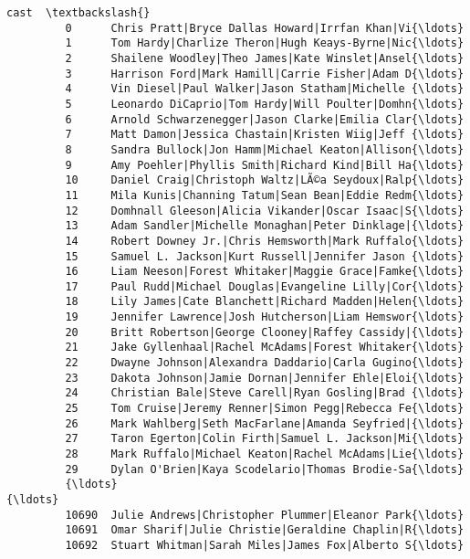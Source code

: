 \documentclass[11pt]{article}
\begin{document}
\begin{Verbatim}[commandchars=\\\{\}]
                                                             cast  \textbackslash{}
         0      Chris Pratt|Bryce Dallas Howard|Irrfan Khan|Vi{\ldots}   
         1      Tom Hardy|Charlize Theron|Hugh Keays-Byrne|Nic{\ldots}   
         2      Shailene Woodley|Theo James|Kate Winslet|Ansel{\ldots}   
         3      Harrison Ford|Mark Hamill|Carrie Fisher|Adam D{\ldots}   
         4      Vin Diesel|Paul Walker|Jason Statham|Michelle {\ldots}   
         5      Leonardo DiCaprio|Tom Hardy|Will Poulter|Domhn{\ldots}   
         6      Arnold Schwarzenegger|Jason Clarke|Emilia Clar{\ldots}   
         7      Matt Damon|Jessica Chastain|Kristen Wiig|Jeff {\ldots}   
         8      Sandra Bullock|Jon Hamm|Michael Keaton|Allison{\ldots}   
         9      Amy Poehler|Phyllis Smith|Richard Kind|Bill Ha{\ldots}   
         10     Daniel Craig|Christoph Waltz|LÃ©a Seydoux|Ralp{\ldots}   
         11     Mila Kunis|Channing Tatum|Sean Bean|Eddie Redm{\ldots}   
         12     Domhnall Gleeson|Alicia Vikander|Oscar Isaac|S{\ldots}   
         13     Adam Sandler|Michelle Monaghan|Peter Dinklage|{\ldots}   
         14     Robert Downey Jr.|Chris Hemsworth|Mark Ruffalo{\ldots}   
         15     Samuel L. Jackson|Kurt Russell|Jennifer Jason {\ldots}   
         16     Liam Neeson|Forest Whitaker|Maggie Grace|Famke{\ldots}   
         17     Paul Rudd|Michael Douglas|Evangeline Lilly|Cor{\ldots}   
         18     Lily James|Cate Blanchett|Richard Madden|Helen{\ldots}   
         19     Jennifer Lawrence|Josh Hutcherson|Liam Hemswor{\ldots}   
         20     Britt Robertson|George Clooney|Raffey Cassidy|{\ldots}   
         21     Jake Gyllenhaal|Rachel McAdams|Forest Whitaker{\ldots}   
         22     Dwayne Johnson|Alexandra Daddario|Carla Gugino{\ldots}   
         23     Dakota Johnson|Jamie Dornan|Jennifer Ehle|Eloi{\ldots}   
         24     Christian Bale|Steve Carell|Ryan Gosling|Brad {\ldots}   
         25     Tom Cruise|Jeremy Renner|Simon Pegg|Rebecca Fe{\ldots}   
         26     Mark Wahlberg|Seth MacFarlane|Amanda Seyfried|{\ldots}   
         27     Taron Egerton|Colin Firth|Samuel L. Jackson|Mi{\ldots}   
         28     Mark Ruffalo|Michael Keaton|Rachel McAdams|Lie{\ldots}   
         29     Dylan O'Brien|Kaya Scodelario|Thomas Brodie-Sa{\ldots}   
         {\ldots}                                                  {\ldots}   
         10690  Julie Andrews|Christopher Plummer|Eleanor Park{\ldots}   
         10691  Omar Sharif|Julie Christie|Geraldine Chaplin|R{\ldots}   
         10692  Stuart Whitman|Sarah Miles|James Fox|Alberto S{\ldots}   

\end{Verbatim}
\end{document}
